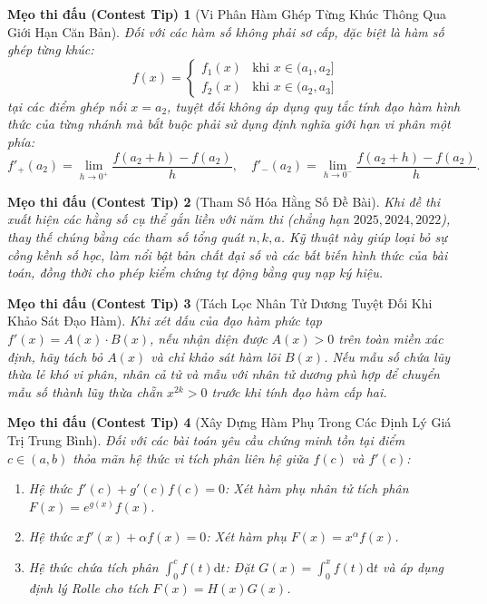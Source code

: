 \documentclass{article}
\newtheorem{tip}{Mẹo thi đấu (Contest Tip)}
\begin{document}
\begin{tip}[Vi Phân Hàm Ghép Từng Khúc Thông Qua Giới Hạn Căn Bản]
Đối với các hàm số không phải sơ cấp, đặc biệt là hàm số ghép từng khúc:
\begin{equation}
    f(x) = \begin{cases} f_1(x) & \text{khi } x \in (a_1, a_2] \\ f_2(x) & \text{khi } x \in (a_2, a_3] \end{cases}
\end{equation}
tại các điểm ghép nối $x = a_2$, tuyệt đối không áp dụng quy tắc tính đạo hàm hình thức của từng nhánh mà bắt buộc phải sử dụng định nghĩa giới hạn vi phân một phía:
\begin{equation}
    f'_+(a_2) = \lim_{h \to 0^+} \frac{f(a_2 + h) - f(a_2)}{h}, \quad f'_-(a_2) = \lim_{h \to 0^-} \frac{f(a_2 + h) - f(a_2)}{h}.
\end{equation}
\end{tip}

\begin{tip}[Tham Số Hóa Hằng Số Đề Bài]
Khi đề thi xuất hiện các hằng số cụ thể gắn liền với năm thi (chẳng hạn $2025, 2024, 2022$), thay thế chúng bằng các tham số tổng quát $n, k, a$. Kỹ thuật này giúp loại bỏ sự cồng kềnh số học, làm nổi bật bản chất đại số và các bất biến hình thức của bài toán, đồng thời cho phép kiểm chứng tự động bằng quy nạp ký hiệu.
\end{tip}

\begin{tip}[Tách Lọc Nhân Tử Dương Tuyệt Đối Khi Khảo Sát Đạo Hàm]
Khi xét dấu của đạo hàm phức tạp $f'(x) = A(x) \cdot B(x)$, nếu nhận diện được $A(x) > 0$ trên toàn miền xác định, hãy tách bỏ $A(x)$ và chỉ khảo sát hàm lõi $B(x)$. Nếu mẫu số chứa lũy thừa lẻ khó vi phân, nhân cả tử và mẫu với nhân tử dương phù hợp để chuyển mẫu số thành lũy thừa chẵn $x^{2k} > 0$ trước khi tính đạo hàm cấp hai.
\end{tip}

\begin{tip}[Xây Dựng Hàm Phụ Trong Các Định Lý Giá Trị Trung Bình]
Đối với các bài toán yêu cầu chứng minh tồn tại điểm $c \in (a, b)$ thỏa mãn hệ thức vi tích phân liên hệ giữa $f(c)$ và $f'(c)$:
\begin{enumerate}
    \item Hệ thức $f'(c) + g'(c) f(c) = 0$: Xét hàm phụ nhân tử tích phân $F(x) = e^{g(x)} f(x)$.
    \item Hệ thức $x f'(x) + \alpha f(x) = 0$: Xét hàm phụ $F(x) = x^\alpha f(x)$.
    \item Hệ thức chứa tích phân $\int_0^c f(t)\mathrm{d}t$: Đặt $G(x) = \int_0^x f(t)\mathrm{d}t$ và áp dụng định lý Rolle cho tích $F(x) = H(x) G(x)$.
\end{enumerate}
\end{tip}
\end{document}
